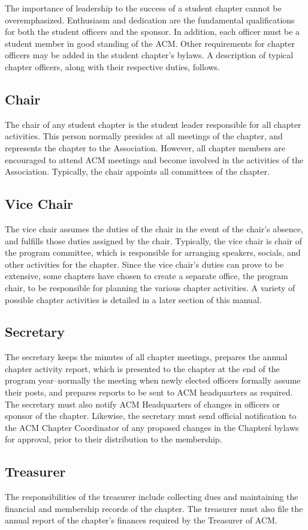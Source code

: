 The importance of leadership to the success of a student chapter cannot be overemphasized. Enthusiasm and dedication are the fundamental qualifications for both the student officers and the sponsor. In addition, each officer must be a student member in good standing of the ACM. Other requirements for chapter officers may be added in the student chapter's bylaws. A description of typical chapter officers, along with their respective duties, follows.
\subsection*{Chair}
The chair of any student chapter is the student leader responsible for all chapter activities. This person normally presides at all meetings of the chapter, and represents the chapter to the Association. However, all chapter members are encouraged to attend ACM meetings and become involved in the activities of the Association. Typically, the chair appoints all committees of the chapter.
\subsection*{Vice Chair}
The vice chair assumes the duties of the chair in the event of the chair's absence, and fulfills those duties assigned by the chair. Typically, the vice chair is chair of the program committee, which is responsible for arranging speakers, socials, and other activities for the chapter. Since the vice chair's duties can prove to be extensive, some chapters have chosen to create a separate office, the program chair, to be responsible for planning the various chapter activities. A variety of possible chapter activities is detailed in a later section of this manual.
\subsection*{Secretary}
The secretary keeps the minutes of all chapter meetings, prepares the annual chapter activity report, which is presented to the chapter at the end of the program year--normally the meeting when newly elected officers formally assume their posts, and prepares reports to be sent to ACM headquarters as required. The secretary must also notify ACM Headquarters of changes in officers or sponsor of the chapter. Likewise, the secretary must send official notification to the ACM Chapter Coordinator of any proposed changes in the Chapter\'s bylaws for approval, prior to their distribution to the membership.
\subsection*{Treasurer}
The responsibilities of the treasurer include collecting dues and maintaining the financial and membership records of the chapter. The treasurer must also file the annual report of the chapter's finances required by the Treasurer of ACM.
